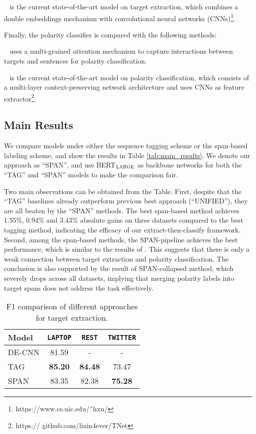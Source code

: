 \documentclass[11pt,a4paper]{article}
\newcommand\bertlarge{BERT$_{\textsc{LARGE}}$\xspace}
\begin{document}
~\cite{xu2018double} is the current state-of-the-art model on target extraction, which combines a double embeddings mechanism with convolutional neural networks (CNNs)\footnote{https://www.cs.uic.edu/˜hxu/}.

Finally, the polarity classifier is compared with the following methods:

~\cite{fan2018multi} uses a multi-grained attention mechanism to capture interactions between targets and sentences for polarity classification.

~\cite{li2018transformation} is the current state-of-the-art model on polarity classification, which consists of a multi-layer context-preserving network architecture and uses CNNs as feature extractor\footnote{https:// github.com/lixin4ever/TNet}.


\subsection{Main Results}
We compare models under either the sequence tagging scheme or the span-based labeling scheme, and show the results in Table \ref{tab:main_results}.
We denote our approach as ``SPAN'', and use \bertlarge as backbone networks for both the ``TAG'' and ``SPAN'' models to make the comparison fair.

Two main observations can be obtained from the Table.
First, despite that the ``TAG'' baselines already outperform previous best approach (``UNIFIED''), they are all beaten by the ``SPAN'' methods.
The best span-based method achieves 1.55\%, 0.94\% and 3.43\% absolute gains on three datasets compared to the best tagging method, indicating the efficacy of our extract-then-classify framework.
Second, among the span-based methods, the SPAN-pipeline achieves the best performance, which is similar to the results of \citet{mitchell2013open,zhang2015neural}. 
This suggests that there is only a weak connection between target extraction and polarity classification.
The conclusion is also supported by the result of SPAN-collapsed method, which severely drops across all datasets, implying that merging polarity labels into target spans does not address the task effectively.

\begin{table}
\begin{center}
\begin{tabular}{l|c|c|c}
\toprule
Model  & \texttt{LAPTOP}  & \texttt{REST} & \texttt{TWITTER} \\ 
\midrule
DE-CNN  & 81.59 & - & -  \\
TAG     & \textbf{85.20} & \textbf{84.48} & 73.47  \\
SPAN    & 83.35 & 82.38 & \textbf{75.28}  \\
\bottomrule
\end{tabular}
\caption{\label{tab:target_extra} F1 comparison of different approaches for target extraction.}
\end{center}
\end{table}
\end{document}
